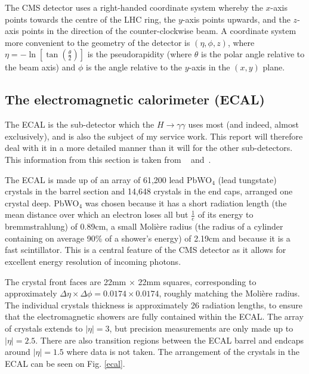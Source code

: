 \documentclass[10pt]{article}
\begin{document}
The CMS detector uses a right-handed coordinate system whereby the $x$-axis points towards the centre of the LHC ring, the $y$-axis points upwards, and the $z$-axis points in the direction of the counter-clockwise beam. A coordinate system more convenient to the geometry of the detector is $(\eta,\phi,z)$, where $\eta = -\ln [ \tan(\frac{\theta}{2})]$ is the pseudorapidity (where $\theta$ is the polar angle relative to the beam axis) and $\phi$ is the angle relative to the $y$-axis in the $(x,y)$ plane.

\subsection{The electromagnetic calorimeter (ECAL)}

The ECAL is the sub-detector which the $H \rightarrow \gamma \gamma$ uses most (and indeed, almost exclusively), and is also the subject of my service work. This report will therefore deal with it in a more detailed manner than it will for the other sub-detectors. This information from this section is taken from ~\cite{CMSTDR} and~\cite{cmsEcal}.

The ECAL is made up of an array of 61,200 lead PbWO$_4$ (lead tungstate) crystals in the barrel section and 14,648 crystals in the end caps, arranged one crystal deep. PbWO$_4$ was chosen because it has a short radiation length (the mean distance over which an electron loses all but $\frac{1}{e}$ of its energy to bremmstrahlung) of 0.89cm, a small Molière radius (the radius of a cylinder containing on average 90\% of a shower's energy) of 2.19cm and because it is a fast scintillator. This is a central feature of the CMS detector as it allows for excellent energy resolution of incoming photons. 

The crystal front faces are 22mm $\times$ 22mm squares, corresponding to approximately $\Delta \eta \times \Delta \phi = 0.0174 \times 0.0174$, roughly matching the Molière radius. The individual crystals thickness is approximately 26 radiation lengths, to ensure that the electromagnetic showers are fully contained within the ECAL. The array of crystals extends to $|\eta| =3$, but precision measurements are only made up to $|\eta| =2.5$. There are also transition regions between the ECAL barrel and endcaps around $|\eta| =1.5$ where data is not taken. The arrangement of the crystals in the ECAL can be seen on Fig. \ref{ecal}.
\end{document}

